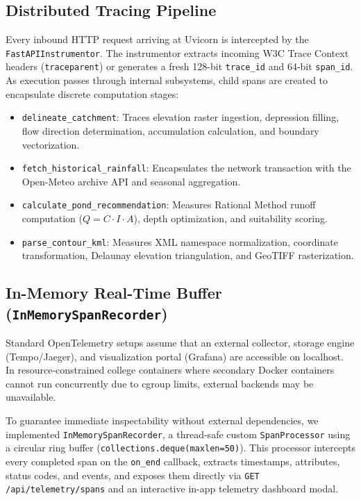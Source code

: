 \documentclass[11pt,a4paper]{article}
\begin{document}
\subsection{Distributed Tracing Pipeline}
Every inbound HTTP request arriving at Uvicorn is intercepted by the \texttt{FastAPIInstrumentor}. The instrumentor extracts incoming W3C Trace Context headers (\texttt{traceparent}) or generates a fresh 128-bit \texttt{trace\_id} and 64-bit \texttt{span\_id}. As execution passes through internal subsystems, child spans are created to encapsulate discrete computation stages:
\begin{itemize}[leftmargin=*]
    \item \texttt{delineate\_catchment}: Traces elevation raster ingestion, depression filling, flow direction determination, accumulation calculation, and boundary vectorization.
    \item \texttt{fetch\_historical\_rainfall}: Encapsulates the network transaction with the Open-Meteo archive API and seasonal aggregation.
    \item \texttt{calculate\_pond\_recommendation}: Measures Rational Method runoff computation ($Q = C \cdot I \cdot A$), depth optimization, and suitability scoring.
    \item \texttt{parse\_contour\_kml}: Measures XML namespace normalization, coordinate transformation, Delaunay elevation triangulation, and GeoTIFF rasterization.
\end{itemize}

\subsection{In-Memory Real-Time Buffer (\texttt{InMemorySpanRecorder})}
Standard OpenTelemetry setups assume that an external collector, storage engine (Tempo/Jaeger), and visualization portal (Grafana) are accessible on localhost. In resource-constrained college containers where secondary Docker containers cannot run concurrently due to cgroup limits, external backends may be unavailable. 

To guarantee immediate inspectability without external dependencies, we implemented \texttt{InMemorySpanRecorder}, a thread-safe custom \texttt{SpanProcessor} using a circular ring buffer (\texttt{collections.deque(maxlen=50)}). This processor intercepts every completed span on the \texttt{on\_end} callback, extracts timestamps, attributes, status codes, and events, and exposes them directly via \texttt{GET /api/telemetry/spans} and an interactive in-app telemetry dashboard modal.
\end{document}
